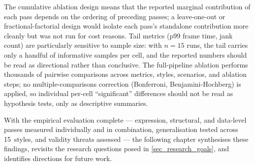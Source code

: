The cumulative ablation design means that the reported marginal contribution of each pass depends on the ordering of preceding passes; a leave-one-out or fractional-factorial design would isolate each pass's standalone contribution more cleanly but was not run for cost reasons.
Tail metrics (p99 frame time, jank count) are particularly sensitive to sample size: with $n=15$ runs, the tail carries only a handful of informative samples per cell, and the reported numbers should be read as directional rather than conclusive.
The full-pipeline ablation performs thousands of pairwise comparisons across metrics, styles, scenarios, and ablation steps; no multiple-comparisons correction (Bonferroni, Benjamini-Hochberg) is applied, so individual per-cell \enquote{significant} differences should not be read as hypothesis tests, only as descriptive summaries.

\medskip\noindent
With the empirical evaluation complete --- expression, structural, and data-level passes measured individually and in combination, generalisation tested across 15~styles, and validity threats assessed --- the following chapter synthesises these findings, revisits the research questions posed in \cref{sec_research_goals}, and identifies directions for future work.
